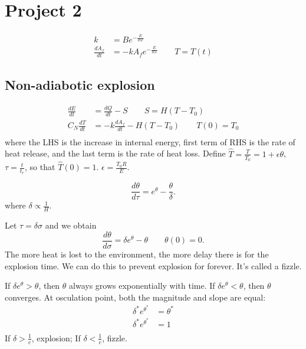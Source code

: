 \documentclass[class=article, crop=false]{standalone}
\theoremstyle{plain}
\theoremstyle{remark}
\begin{document}
\section{Project 2}
\begin{align*}
	k &= B e^{-\frac{E}{RT}} \\
	\frac{dA_f}{dt}&=-k A_f e^{-\frac{E}{RT}} \qquad T=T(t)
\end{align*}
\subsection{Non-adiabotic explosion}
\begin{align*}
	\frac{dE}{dt} &= \frac{dQ}{dt}-S \qquad S=H(T-T_0) \\
	C_N \frac{dT}{dt} &=  -k \frac{dA_f}{dt}-H(T-T_0) \qquad T(0)=T_0 \\
\end{align*}
where the LHS is the increase in internal energy, first term of RHS is the rate of heat release, and the last term is the rate of heat loss.
Define $\hat{T}=\frac{T}{T_0}=1+\epsilon \theta$, $\tau=\frac{t}{t_r}$, so that $\hat{T}(0)=1$. $\epsilon = \frac{T_0 R}{E}$. 

\[
\frac{d\theta}{d\tau}=e^{\theta} - \frac{\theta}{\delta}
.\] 
where $\delta \propto \frac{1}{H}$.

Let $\tau=\delta \sigma$ and we obtain
\[
	\frac{d\theta}{d\sigma} = \delta e^{\theta} - \theta \qquad \theta(0)=0
.\] 
The more heat is lost to the environment, the more delay there is for the explosion time. We can do this to prevent explosion for forever. It's called a fizzle.

If $\delta e^{\theta}>\theta$, then $\theta$ always grows exponentially with time.
If $\delta e^{\theta} < \theta$, then $\theta$ converges.
At osculation point, both the magnitude and slope are equal:
\begin{align*}
	\delta^* e^{\theta^*} &= \theta^* \\
	\delta^* e^{\theta^*} &= 1 \\
\end{align*}
If $\delta > \frac{1}{e}$, explosion; If $\delta<\frac{1}{e}$, fizzle.
\end{document}
